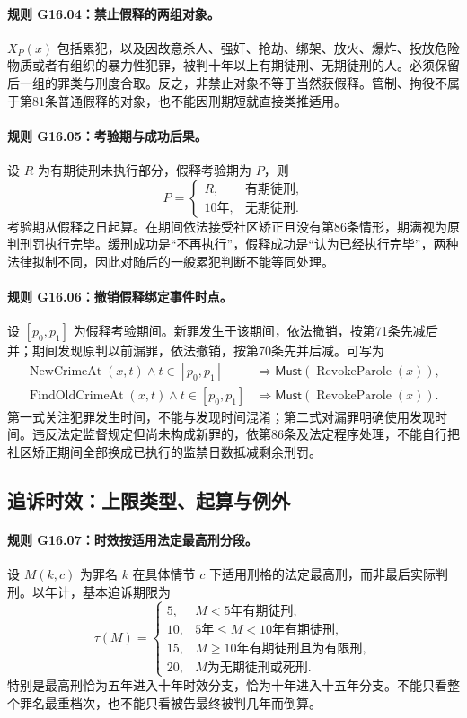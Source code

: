 \paragraph{规则 G16.04：禁止假释的两组对象。}
$X_P(x)$ 包括累犯，以及因故意杀人、强奸、抢劫、绑架、放火、爆炸、投放危险物质或者有组织的暴力性犯罪，被判十年以上有期徒刑、无期徒刑的人。必须保留后一组的罪类与刑度合取。反之，非禁止对象不等于当然获假释。管制、拘役不属于第81条普通假释的对象，也不能因刑期短就直接类推适用。

\paragraph{规则 G16.05：考验期与成功后果。}
设 $R$ 为有期徒刑未执行部分，假释考验期为 $P$，则
\[
P=\begin{cases}R,&\text{有期徒刑},\\10\text{年},&\text{无期徒刑}.\end{cases}
\]
考验期从假释之日起算。在期间依法接受社区矫正且没有第86条情形，期满视为原判刑罚执行完毕。缓刑成功是“不再执行”，假释成功是“认为已经执行完毕”，两种法律拟制不同，因此对随后的一般累犯判断不能等同处理。

\paragraph{规则 G16.06：撤销假释绑定事件时点。}
设 $[p_0,p_1]$ 为假释考验期间。新罪发生于该期间，依法撤销，按第71条先减后并；期间发现原判以前漏罪，依法撤销，按第70条先并后减。可写为
\[
\begin{aligned}
\operatorname{NewCrimeAt}(x,t)\land t\in[p_0,p_1]
&\Longrightarrow\mathsf{Must}(\operatorname{RevokeParole}(x)),\\
\operatorname{FindOldCrimeAt}(x,t)\land t\in[p_0,p_1]
&\Longrightarrow\mathsf{Must}(\operatorname{RevokeParole}(x)).
\end{aligned}
\]
第一式关注犯罪发生时间，不能与发现时间混淆；第二式对漏罪明确使用发现时间。违反法定监督规定但尚未构成新罪的，依第86条及法定程序处理，不能自行把社区矫正期间全部换成已执行的监禁日数抵减剩余刑罚。

\subsection{追诉时效：上限类型、起算与例外}
\paragraph{规则 G16.07：时效按适用法定最高刑分段。}
设 $M(k,c)$ 为罪名 $k$ 在具体情节 $c$ 下适用刑格的法定最高刑，而非最后实际判刑。以年计，基本追诉期限为
\[
\tau(M)=
\begin{cases}
5,&M<5\text{年有期徒刑},\\
10,&5\text{年}\le M<10\text{年有期徒刑},\\
15,&M\ge10\text{年有期徒刑且为有限刑},\\
20,&M\text{为无期徒刑或死刑}.
\end{cases}
\]
特别是最高刑恰为五年进入十年时效分支，恰为十年进入十五年分支。不能只看整个罪名最重档次，也不能只看被告最终被判几年而倒算。

